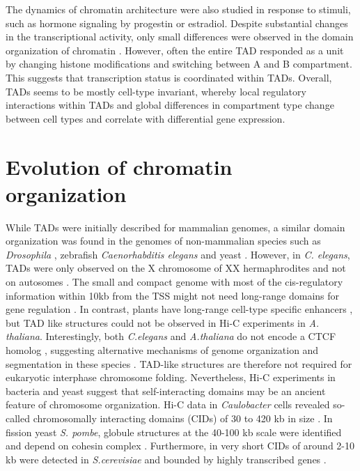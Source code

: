 \documentclass[a4paper,twoside=true,openright,parskip=full,chapterprefix=true,11pt,headings=normal,bibliography=totoc,listof=totoc,titlepage=on,captions=tableabove,draft=false]{scrreprt}
\theoremstyle{definition}
\theoremstyle{definition}
\theoremstyle{definition}
\theoremstyle{remark}
\begin{document}
The dynamics of chromatin architecture were also studied in response to
stimuli, such as hormone signaling by progestin or estradiol. Despite
substantial changes in the transcriptional activity, only small
differences were observed in the domain organization of chromatin
\citep{LeDily2014}. However, often the entire TAD responded as a unit by
changing histone modifications and switching between A and B
compartment. This suggests that transcription status is coordinated
within TADs. Overall, TADs seems to be mostly cell-type invariant,
whereby local regulatory interactions within TADs and global differences
in compartment type change between cell types and correlate with
differential gene expression.

\hypertarget{evolution-of-chromatin-organization}{%
\section{Evolution of chromatin
organization}\label{evolution-of-chromatin-organization}}

While TADs were initially described for mammalian genomes, a similar
domain organization was found in the genomes of non-mammalian species
such as \emph{Drosophila} \citep{Sexton2012}, zebrafish
\citep{Gomez-Marin2015} \emph{Caenorhabditis elegans} \citep{Crane2015}
and yeast \citep{Hsieh2015, Mizuguchi2014}. However, in \emph{C.
elegans}, TADs were only observed on the X chromosome of XX
hermaphrodites and not on autosomes \citep{Crane2015}. The small and
compact genome with most of the cis-regulatory information within 10kb
from the TSS might not need long-range domains for gene regulation
\citep{Long2016}. In contrast, plants have long-range cell-type specific
enhancers \citep{Zhu2015}, but TAD like structures could not be observed
in Hi-C experiments in \emph{A. thaliana}. Interestingly, both
\emph{C.elegans} and \emph{A.thaliana} do not encode a CTCF homolog
\citep{Heger2012}, suggesting alternative mechanisms of genome
organization and segmentation in these species \citep{Long2016}.
TAD-like structures are therefore not required for eukaryotic interphase
chromosome folding. Nevertheless, Hi-C experiments in bacteria and yeast
suggest that self-interacting domains may be an ancient feature of
chromosome organization. Hi-C data in \emph{Caulobacter} cells revealed
so-called chromosomally interacting domains (CIDs) of 30 to 420 kb in
size \citep{Le2013}. In fission yeast \emph{S. pombe}, globule
structures at the 40-100 kb scale were identified and depend on cohesin
complex \citep{Mizuguchi2014}. Furthermore, in very short CIDs of around
2-10 kb were detected in \emph{S.cerevisiae} and bounded by highly
transcribed genes \citep{Hsieh2015}.
\end{document}
